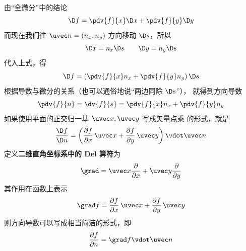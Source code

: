 由“全微分”中的结论
\begin{equation}
\D f = \pdv{f}{x} \D x + \pdv{f}{y}\D y
\end{equation}
而现在我们往 $\uvec n = \left( {{n_x},{n_y}} \right)$ 方向移动 $\D s$，所以
\begin{equation}
\D x = n_x \D s \qquad \D y = n_y \D s
\end{equation}
代入上式，得
\begin{equation}
\D f =  \left(\pdv{f}{x} n_x + \pdv{f}{y} n_y \right) \D s
\end{equation}
根据导数与微分的关系（也可以通俗地说“两边同除 $\D s$”）， 就得到方向导数
\begin{equation}
\pdv{f}{n} = \dv{f}{s} = \pdv{f}{x} n_x + \pdv{f}{y} n_y
\end{equation}
如果使用平面的正交归一基 $\uvec x, \uvec y$ 写成矢量点乘 的形式，就是
\begin{equation}
\frac{{\D f}}{{\D n}} = \left( {\frac{{\partial f}}{{\partial x}}\,\uvec x + \frac{{\partial f}}{{\partial y}}\,\uvec y} \right) \vdot \uvec n
\end{equation} 
定义\textbf{二维直角坐标系中的 Del 算符}为
\begin{equation}
\grad  = \uvec x\frac{\partial }{{\partial x}} + \uvec y\frac{\partial }{{\partial y}}
\end{equation}
其作用在函数上表示
\begin{equation}
\grad f = \frac{{\partial f}}{{\partial x}}\,\uvec x + \frac{{\partial f}}{{\partial y}}\,\uvec y
\end{equation} 
则方向导数可以写成相当简洁的形式，即
\begin{equation}\label{DerDir_eq7}
\frac{{\partial f}}{{\partial n}} = \grad f \vdot \uvec n
\end{equation} 

